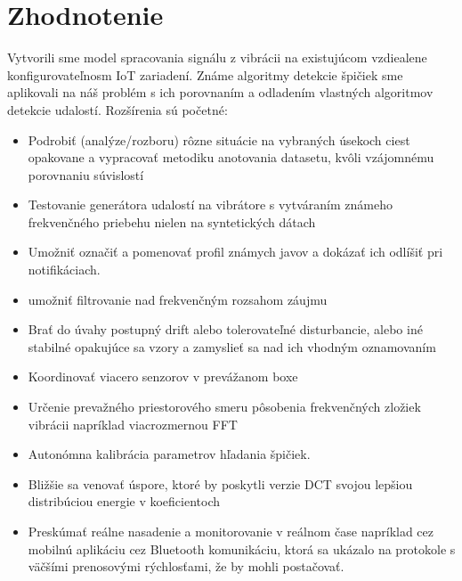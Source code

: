 \chapter{Zhodnotenie}
Vytvorili sme model spracovania signálu z vibrácii na existujúcom vzdiealene konfigurovateľnosm IoT zariadení.
Známe algoritmy detekcie špičiek sme aplikovali na náš problém s ich porovnaním a
odladením vlastných algoritmov detekcie udalostí.
Rozšírenia sú početné:
\begin{itemize}[noitemsep]
\item Podrobiť (analýze/rozboru) rôzne situácie na vybraných úsekoch ciest opakovane a vypracovať metodiku anotovania datasetu,
kvôli vzájomnému porovnaniu súvislostí
\item Testovanie generátora udalostí na vibrátore s vytváraním známeho frekvenčného priebehu nielen na syntetických dátach
\item Umožniť označiť a pomenovať profil známych javov a dokázať ich odlíšiť pri notifikáciach.
\item umožniť filtrovanie nad frekvenčným rozsahom záujmu
\item Brať do úvahy postupný drift alebo tolerovateľné disturbancie, alebo iné stabilné opakujúce sa vzory a zamyslieť sa
nad ich vhodným oznamovaním
\item Koordinovať viacero senzorov v prevážanom boxe
\item Určenie prevažného priestorového smeru pôsobenia frekvenčných zložiek vibrácii napríklad viacrozmernou FFT
\item Autonómna kalibrácia parametrov hľadania špičiek.
\item Bližšie sa venovať úspore, ktoré by poskytli verzie DCT svojou lepšiou distribúciou energie v koeficientoch
\item  Preskúmať reálne nasadenie a monitorovanie v reálnom čase napríklad cez mobilnú aplikáciu cez Bluetooth komunikáciu,
ktorá sa ukázalo na protokole s väčšími prenosovými rýchlosťami, že by mohli postačovať.
\end{itemize}

\cleardoublepage